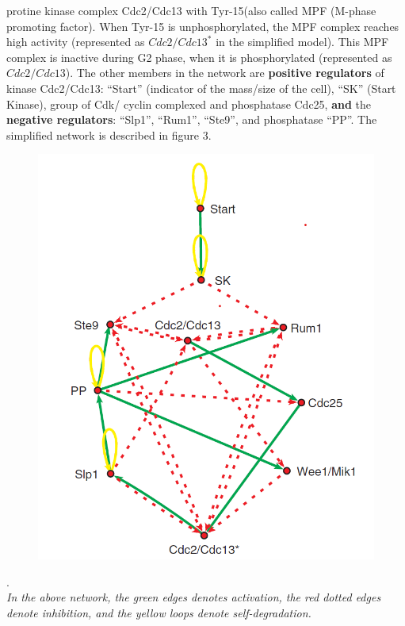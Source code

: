 \documentclass{article}
\begin{document}
protine kinase complex Cdc2/Cdc13 with Tyr-15(also called MPF (M-phase promoting factor).
When Tyr-15 is unphosphorylated, the MPF complex reaches high activity (represented
 as $Cdc2/Cdc13^*$ in the simplified model). This MPF complex
is inactive during G2 phase, when it is phosphorylated (represented as $Cdc2/Cdc13$).
The other members in the network are \textbf{positive regulators} of kinase Cdc2/Cdc13:
``Start'' (indicator of the mass/size of the cell), ``SK'' (Start Kinase), 
group of Cdk/ cyclin complexed and phosphatase Cdc25, \textbf{and} the \textbf{negative 
regulators}: ``Slp1'', ``Rum1'', ``Ste9'', and phosphatase ``PP''. The
simplified network is described in figure 3.
\begin{figure}[H]
  \centering
  \includegraphics[width=\linewidth, scale=0.5]{cell_cycle_simple.png} \\
\end{figure}
. \\
\textit{In the above network, the green edges denotes activation, the red dotted edges denote
inhibition, and the yellow loops denote self-degradation.}
\end{document}
